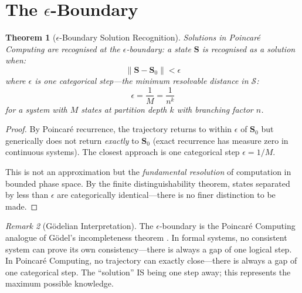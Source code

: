 \documentclass[twocolumn,10pt,a4paper]{article}
\theoremstyle{plain}
\newtheorem{theorem}{Theorem}[section]
\theoremstyle{definition}
\theoremstyle{remark}
\newtheorem{remark}[theorem]{Remark}
\newcommand{\Sspace}{\mathcal{S}}
\newcommand{\Scoord}{\mathbf{S}}
\begin{document}
\section{The $\epsilon$-Boundary}
\label{sec:epsilon}

\begin{theorem}[$\epsilon$-Boundary Solution Recognition]
\label{thm:epsilon}
Solutions in Poincar\'{e} Computing are recognised at the \emph{$\epsilon$-boundary}: a state $\Scoord$ is recognised as a solution when:
\begin{equation}
    \|\Scoord - \Scoord_0\| < \epsilon
\end{equation}
where $\epsilon$ is one categorical step---the minimum resolvable distance in $\Sspace$:
\begin{equation}
    \epsilon = \frac{1}{M} = \frac{1}{n^k}
\end{equation}
for a system with $M$ states at partition depth $k$ with branching factor $n$.
\end{theorem}

\begin{proof}
By Poincar\'{e} recurrence, the trajectory returns to within $\epsilon$ of $\Scoord_0$ but generically does not return \emph{exactly} to $\Scoord_0$ (exact recurrence has measure zero in continuous systems). The closest approach is one categorical step $\epsilon = 1/M$.

This is not an approximation but the \emph{fundamental resolution} of computation in bounded phase space. By the finite distinguishability theorem, states separated by less than $\epsilon$ are categorically identical---there is no finer distinction to be made.
\end{proof}

\begin{remark}[G\"{o}delian Interpretation]
The $\epsilon$-boundary is the Poincar\'{e} Computing analogue of G\"{o}del's incompleteness theorem \cite{godel1931}. In formal systems, no consistent system can prove its own consistency---there is always a gap of one logical step. In Poincar\'{e} Computing, no trajectory can exactly close---there is always a gap of one categorical step. The ``solution'' IS being one step away; this represents the maximum possible knowledge.
\end{remark}
\end{document}

